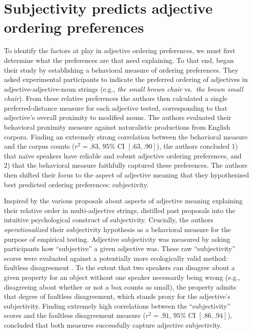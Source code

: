 \documentclass[preprint,authoryear]{elsarticle}\frenchspacing
\begin{document}
\section{Subjectivity predicts adjective ordering preferences} \label{review}

To identify the factors at play in adjective ordering preferences, we must first determine what the preferences are that need explaining. To that end, \cite{scontrasetal2017adjectives} began their study by establishing a behavioral measure of ordering preferences. They asked experimental participants to indicate the preferred ordering of adjectives in adjective-adjective-noun strings (e.g., \emph{the small brown chair} vs.~\emph{the brown small chair}). From these relative preferences the authors then calculated a single preferred-distance measure for each adjective tested, corresponding to that adjective's overall proximity to modified nouns. The authors evaluated their behavioral proximity measure against naturalistic productions from English corpora. Finding an extremely strong correlation between the behavioral measure and the corpus counts ($r^2 = .83$, $95$\% CI $[.63, .90]$), the authors concluded 1) that na\"ive speakers have reliable and robust adjective ordering preferences, and 2) that the behavioral measure faithfully captured these preferences. The authors then shifted their focus to the aspect of adjective meaning that they hypothesized best predicted ordering preferences: subjectivity. 

Inspired by the various proposals about aspects of adjective meaning explaining their relative order in multi-adjective strings, \citeauthor{scontrasetal2017adjectives} distilled past proposals into the intuitive psychological construct of subjectivity. Crucially, the authors \emph{operationalized} their subjectivity hypothesis as a behavioral measure for the purpose of empirical testing. Adjective subjectivity was measured by asking participants how ``subjective'' a given adjective was. These raw ``subjectivity'' scores were evaluated against a potentially more ecologically valid method: faultless disagreement \citep{kolbel2004,barker2013,kennedy2013,macfarlane2014}. To the extent that two speakers can disagree about a given property for an object without one speaker necessarily being wrong (e.g., disagreeing about whether or not a box counts as small), the property admits that degree of faultless disagreement, which stands proxy for the adjective's subjectivity. Finding extremely high correlations between the ``subjectivity'' scores and the faultless disagreement measure ($r^2 = .91$, $95$\% CI $[.86, .94]$), \citeauthor{scontrasetal2017adjectives} concluded that both measures successfully capture adjective subjectivity.
\end{document}
